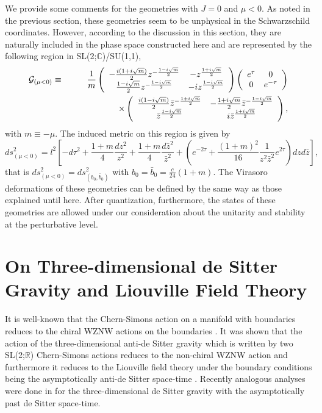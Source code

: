 \documentclass[a4paper,11pt]{article}
\begin{document}
We provide some comments for the geometries with $J=0$ and $\mu<0$.
As noted in the previous section, 
these geometries seem to be unphysical in the Schwarzschild  
coordinates. However, according to the discussion in this section, 
they are naturally included in the phase space 
constructed here and are represented by the following region in 
SL(2;$\mathbb{C}$)/SU(1,1), 
\begin{eqnarray}
 {\cal G}_{(\mu<0)} &\equiv& \frac{1}{m}
 \left(\begin{array}{cc}
  -\frac{i(1+i\sqrt{m})}{2}z^{-\frac{1-i\sqrt{m}}{2}} & 
    -z^{\frac{1+i\sqrt{m}}{2}} \\
  \frac{1-i\sqrt{m}}{2}z^{-\frac{1-i\sqrt{m}}{2}} & 
    -iz^{\frac{1-i\sqrt{m}}{2}}
       \end{array}\right)
 \left(\begin{array}{cc}
  e^{\tau} &  0 \\
  0 & e^{-\tau}
       \end{array}\right) \nonumber \\
&& \hspace*{20mm} \times 
  \left(\begin{array}{cc}
    \frac{i(1-i\sqrt{m})}{2}\bar{z}^{-\frac{1+i\sqrt{m}}{2}} & 
      -\frac{1+i\sqrt{m}}{2}\bar{z}^{-\frac{1-i\sqrt{m}}{2}} \\
    \bar{z}^{\frac{1-i\sqrt{m}}{2}} & 
      i\bar{z}^{\frac{1+i\sqrt{m}}{2}}
       \end{array}\right),
\end{eqnarray}
with $m\equiv-\mu$.
The induced metric on this region is given by 
\begin{equation}
ds^2_{(\mu<0)}=l^2\left[- d\tau^2 +\frac{1+m}{4}\frac{dz^2}{z^2}
                +\frac{1+m}{4}\frac{d\bar{z}^2}{\bar{z}^2}
                +\left(e^{-2\tau}+\frac{(1+m)^2}{16}\frac{1}{z^2 \bar{z}^2}
                  e^{2\tau}\right)dzd\bar{z} \right],
\end{equation}
that is $ds^2_{(\mu<0)}=ds^2_{(b_0, \bar{b}_0)}$ with 
$b_0=\bar{b}_0=\frac{c}{24}(1+m)$.
The Virasoro deformations of these geometries can be defined by the same way 
as those explained until here. 
After quantization, furthermore, the states of these geometries 
are allowed under our consideration about the unitarity and stability
at the perturbative level.

\section{On Three-dimensional de Sitter Gravity and Liouville Field Theory}
It is well-known that the Chern-Simons action on a manifold with
boundaries reduces to the chiral WZNW actions 
on the boundaries \cite{Elitzur}.
It was shown that the action of the three-dimensional anti-de Sitter 
gravity which is written by two SL(2;$\mathbb{R}$) Chern-Simons actions  
reduces to the non-chiral WZNW action and furthermore 
it reduces to the Liouville field theory under the boundary conditions 
being the asymptotically anti-de Sitter space-time \cite{CHD-BO}.
Recently analogous analyses were done in \cite{Klemm1}
for the three-dimensional de Sitter gravity with the asymptotically past
de Sitter space-time.
\end{document}
